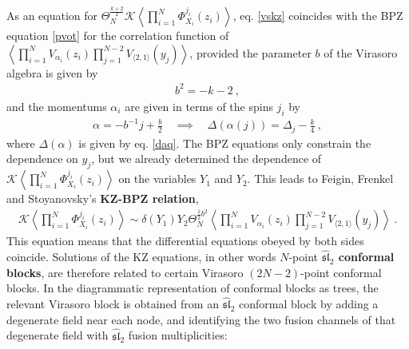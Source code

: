 \documentclass[12pt, a4paper, notitlepage, twoside]{report}
\numberwithin{equation}{section}
\theoremstyle{break}
\begin{document}
As an equation for $\Theta_N^{\frac{k+2}{2}}\mathcal{K}\left\langle \prod_{i=1}^N \Phi^{j_i}_{X_i}(z_i)\right\rangle$,
eq. \eqref{vskz} coincides with the BPZ equation \eqref{pvot} for the correlation function of $\left\langle \prod_{i=1}^N V_{\alpha_i}(z_i) \prod_{j=1}^{N-2}V_{\langle 2,1\rangle}(y_j)\right\rangle$, provided the parameter $b$ of the Virasoro algebra is given by 
\begin{align}
 \boxed{ b^2 = -k-2}\ ,
\label{bk}
\end{align}
and the momentums $\alpha_i$ are given in terms of the spins $j_i$ by 
\begin{align}
 \boxed{\alpha = -b^{-1}j+\frac{b}{2}}\quad \implies \quad \boxed{\Delta(\alpha(j)) = \Delta_j-\frac{k}{4}}\ ,
\label{aj}
\end{align}
where $\Delta(\alpha)$ is given by eq. \eqref{daq}.
The BPZ equations only constrain the dependence on $y_j$, but we already determined the dependence of  
$\mathcal{K}\left\langle \prod_{i=1}^N \Phi^{j_i}_{X_i}(z_i)\right\rangle$ on the variables $Y_1$ and $Y_2$.
This leads to Feigin, Frenkel and Stoyanovsky's \textbf{\boldmath KZ-BPZ relation},
\begin{align}
 \boxed{ \mathcal{K}\left\langle \prod_{i=1}^N \Phi^{j_i}_{X_i}(z_i)\right\rangle \sim \delta(Y_1) Y_2 \Theta_N^{\frac12 b^2} \left\langle \prod_{i=1}^N V_{\alpha_i}(z_i)\prod_{j=1}^{N-2}V_{\langle 2,1\rangle}(y_j)\right\rangle}\ .
\label{dyy}
\end{align}
This equation means that the differential equations obeyed by both sides coincide.
Solutions of the KZ equations, in other words $N$-point \textbf{\boldmath $\widehat{\mathfrak{sl}}_2$ conformal blocks}, are therefore related to certain Virasoro $(2N-2)$-point conformal blocks. 
In the diagrammatic representation of conformal blocks as trees, the relevant Virasoro block is obtained from an $\widehat{\mathfrak{sl}}_2$ conformal block by adding a degenerate field near each node, and identifying the two fusion channels of that degenerate field with $\widehat{\mathfrak{sl}}_2$ fusion multiplicities:
\end{document}
